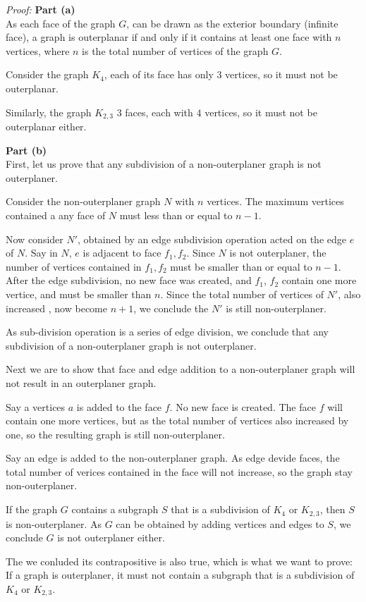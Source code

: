\documentclass{article}
\newenvironment{solution}
    {\textit{Proof:}}
    {}
\begin{document}
\begin{solution}
	\textbf{Part (a)}\\

	As each face of the graph $G$, can be drawn as the exterior boundary (infinite face), a graph is outerplanar if and only if it contains at least one face with $n$ vertices, where $n$ is the total number of vertices of the graph $G$.

	Consider the graph $K_4$, each of its face has only $3$  vertices, so it must not be outerplanar.
	
	Similarly, the graph $K_{2,3}$ 3 faces, each with $4$ vertices, so it must not be outerplanar either.

	\textbf{Part (b)}\\

	First, let us prove that any subdivision of a non-outerplaner graph is not outerplaner. 

	Consider the non-outerplaner graph $N$ with $n$ vertices. The maximum vertices contained a any face of $N$ must less than or equal to $n-1$.

	Now consider $N'$, obtained by an edge subdivision operation acted on the edge $e$ of $N$. Say in $N$, $e$ is adjacent to face $f_1, f_2$. Since $N$ is not outerplaner, the number of vertices contained in $f_1, f_2$ must be smaller than or equal to $n-1$. After the edge subdivision, no new face was created, and $f_1$, $f_2$ contain one more vertice, and must be smaller than $n$. Since the total number of vertices of $N'$, also increased , now become $n+1$, we conclude the $N'$ is still non-outerplaner.

	As sub-division operation is a series of edge division, we conclude that any subdivision of a non-outerplaner graph is not outerplaner.

	Next we are to show that face and edge addition to a non-outerplaner graph will not result in an outerplaner graph.

	Say a vertices $a$ is added to the face $f$. No new face is created. The face $f$ will contain one more vertices, but as the total number of vertices also increased by one, so the resulting graph is still non-outerplaner.

	Say an edge is added to the non-outerplaner graph. As edge devide faces, the total number of verices contained in the face will not increase, so the graph stay non-outerplaner.


	If the graph $G$ contains a subgraph $S$ that is a subdivision of $K_4$ or $K_{2,3}$, then $S$ is non-outerplaner. As $G$ can be obtained by adding vertices and edges to $S$, we conclude $G$ is not outerplaner either.
	
	The we conluded its contrapositive is also true, which is what we want to prove: If a graph is outerplaner, it must not contain a subgraph that is a subdivision of $K_4$ or $K_{2,3}$.
\end{solution} 
\end{document}
